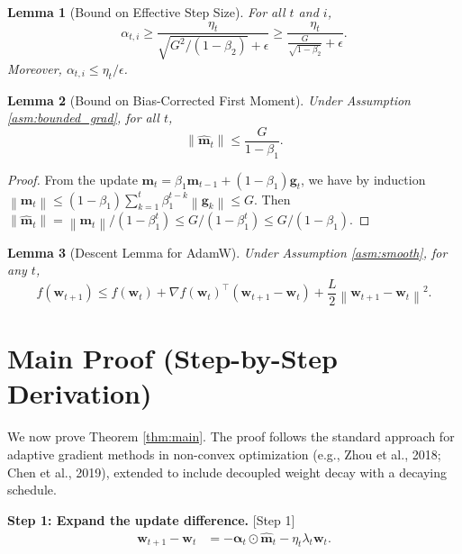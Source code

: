 \documentclass{article}
\theoremstyle{plain}
\newtheorem{lemma}{Lemma}
\theoremstyle{definition}
\renewcommand{\vec}[1]{\boldsymbol{#1}}
\newcommand{\norm}[1]{\left\| #1 \right\|}
\begin{document}
\begin{lemma}[Bound on Effective Step Size] \label{lem:alpha_bound}
For all $t$ and $i$,
\begin{equation}
    \alpha_{t,i} \ge \frac{\eta_t}{\sqrt{G^2/(1-\beta_2)} + \epsilon} \ge \frac{\eta_t}{\frac{G}{\sqrt{1-\beta_2}} + \epsilon}.
\end{equation}
Moreover, $\alpha_{t,i} \le \eta_t / \epsilon$.
\end{lemma}

\begin{lemma}[Bound on Bias-Corrected First Moment] \label{lem:m_hat_bound}
Under Assumption \ref{asm:bounded_grad}, for all $t$,
\begin{equation}
    \norm{\hat{\vec{m}}_t} \le \frac{G}{1-\beta_1}.
\end{equation}
\end{lemma}
\begin{proof}
From the update $\vec{m}_t = \beta_1 \vec{m}_{t-1} + (1-\beta_1) \vec{g}_t$, we have by induction
$\norm{\vec{m}_t} \le (1-\beta_1) \sum_{k=1}^t \beta_1^{t-k} \norm{\vec{g}_k} \le G$.
Then $\norm{\hat{\vec{m}}_t} = \norm{\vec{m}_t} / (1-\beta_1^t) \le G / (1-\beta_1^t) \le G / (1-\beta_1)$.
\end{proof}

\begin{lemma}[Descent Lemma for AdamW] \label{lem:descent}
Under Assumption \ref{asm:smooth}, for any $t$,
\begin{equation}
    f(\vec{w}_{t+1}) \le f(\vec{w}_t) + \nabla f(\vec{w}_t)^\top (\vec{w}_{t+1} - \vec{w}_t) + \frac{L}{2} \norm{\vec{w}_{t+1} - \vec{w}_t}^2.
\end{equation}
\end{lemma}

\section*{Main Proof (Step-by-Step Derivation)}

We now prove Theorem \ref{thm:main}. The proof follows the standard approach for adaptive gradient methods in non-convex optimization (e.g., Zhou et al., 2018; Chen et al., 2019), extended to include decoupled weight decay with a decaying schedule.

\textbf{Step 1: Expand the update difference.} [Step 1]
\begin{align}
    \vec{w}_{t+1} - \vec{w}_t &= - \vec{\alpha}_t \odot \hat{\vec{m}}_t - \eta_t \lambda_t \vec{w}_t. \label{eq:diff}
\end{align}
\end{document}
